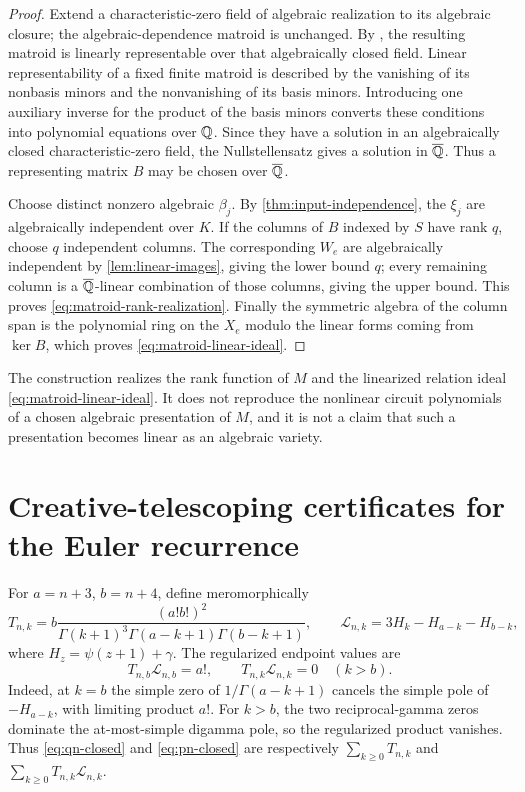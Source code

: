 \begin{proof}
Extend a characteristic-zero field of algebraic realization to its
algebraic closure; the algebraic-dependence matroid is unchanged.  By
\cite[Thm.~1.10]{RosenSidmanTheran2025}, the resulting matroid is linearly
representable over that algebraically closed field.  Linear
representability of a fixed finite
matroid is described by the vanishing of its nonbasis minors and the
nonvanishing of its basis minors.  Introducing one auxiliary inverse for
the product of the basis minors converts these conditions into polynomial
equations over \(\mathbb Q\).  Since they have a solution in an algebraically
closed characteristic-zero field, the Nullstellensatz gives a solution in
\(\overline{\mathbb Q}\).  Thus a representing matrix \(B\) may be chosen over \(\overline{\mathbb Q}\).

Choose distinct nonzero algebraic \(\beta_j\).  By
\cref{thm:input-independence}, the \(\xi_j\) are algebraically independent
over \(K\).  If the columns of \(B\) indexed by \(S\) have rank \(q\),
choose \(q\) independent columns.  The corresponding \(W_e\) are
algebraically independent by \cref{lem:linear-images}, giving the lower
bound \(q\); every remaining column is a \(\overline{\mathbb Q}\)-linear combination of
those columns, giving the upper bound.  This proves
\eqref{eq:matroid-rank-realization}.  Finally the symmetric algebra of the
column span is the polynomial ring on the \(X_e\) modulo the linear forms
coming from \(\ker B\), which proves \eqref{eq:matroid-linear-ideal}.
\end{proof}

\begin{remark}
The construction realizes the rank function of \(M\) and the linearized
relation ideal \eqref{eq:matroid-linear-ideal}.  It does not reproduce the
nonlinear circuit polynomials of a chosen algebraic presentation of
\(M\), and it is not a claim that such a presentation becomes linear as an
algebraic variety.
\end{remark}

\section{Creative-telescoping certificates for the Euler recurrence}
\label{app:telescopers}

For \(a=n+3\), \(b=n+4\), define meromorphically
\[
 T_{n,k}=b\frac{(a!b!)^2}
 {\Gamma(k+1)^3\Gamma(a-k+1)\Gamma(b-k+1)},
 \qquad
 \mathcal L_{n,k}=3H_k-H_{a-k}-H_{b-k},
\]
where \(H_z=\psi(z+1)+\gamma\).  The regularized endpoint values are
\[
 T_{n,b}\mathcal L_{n,b}=a!,
 \qquad
 T_{n,k}\mathcal L_{n,k}=0\quad(k>b).
\]
Indeed, at \(k=b\) the simple zero of
\(1/\Gamma(a-k+1)\) cancels the simple pole of
\(-H_{a-k}\), with limiting product \(a!\).  For \(k>b\), the two
reciprocal-gamma zeros dominate the at-most-simple digamma pole, so the
regularized product vanishes.
Thus \eqref{eq:qn-closed} and \eqref{eq:pn-closed} are respectively
\(\sum_{k\ge0}T_{n,k}\) and
\(\sum_{k\ge0}T_{n,k}\mathcal L_{n,k}\).

